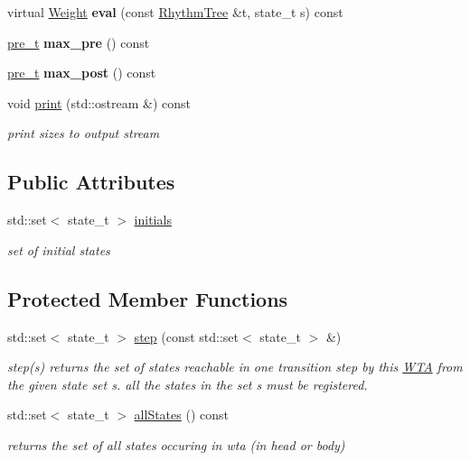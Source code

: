 \begin{DoxyCompactItemize}
virtual \mbox{\hyperlink{classWeight}{Weight}} {\bfseries eval} (const \mbox{\hyperlink{classRhythmTree}{Rhythm\+Tree}} \&t, state\+\_\+t s) const
\item 
\mbox{\label{classWTA_a646bb2048b24358325f8e07c789af82c}} 
\mbox{\hyperlink{group__general_ga092fe8b972dfa977c2a0886720a7731e}{pre\+\_\+t}} {\bfseries max\+\_\+pre} () const
\item 
\mbox{\label{classWTA_a1a5cead20cba42a111ff7ab5546bc54c}} 
\mbox{\hyperlink{group__general_ga092fe8b972dfa977c2a0886720a7731e}{pre\+\_\+t}} {\bfseries max\+\_\+post} () const
\item 
void \mbox{\hyperlink{group__schemata_gaeb713b8807bc81c6c6519ced5d531e06}{print}} (std\+::ostream \&) const
\begin{DoxyCompactList}\small\item\em print sizes to output stream \end{DoxyCompactList}\end{DoxyCompactItemize}
\subsection*{Public Attributes}
\begin{DoxyCompactItemize}
\item 
std\+::set$<$ state\+\_\+t $>$ \mbox{\hyperlink{classWTA_a5d8ace9f515a3902d889db560f08f4c5}{initials}}
\begin{DoxyCompactList}\small\item\em set of initial states \end{DoxyCompactList}\end{DoxyCompactItemize}
\subsection*{Protected Member Functions}
\begin{DoxyCompactItemize}
\item 
std\+::set$<$ state\+\_\+t $>$ \mbox{\hyperlink{group__schemata_gae6fb2dbd82ed290528b90ee7bb4b6ccc}{step}} (const std\+::set$<$ state\+\_\+t $>$ \&)
\begin{DoxyCompactList}\small\item\em step(s) returns the set of states reachable in one transition step by this \mbox{\hyperlink{classWTA}{W\+TA}} from the given state set s. all the states in the set s must be registered. \end{DoxyCompactList}\item 
std\+::set$<$ state\+\_\+t $>$ \mbox{\hyperlink{group__schemata_gab8ea841b4a1e71ef70d3fda927f0507d}{all\+States}} () const
\begin{DoxyCompactList}\small\item\em returns the set of all states occuring in wta (in head or body) \end{DoxyCompactList}\end{DoxyCompactItemize}
